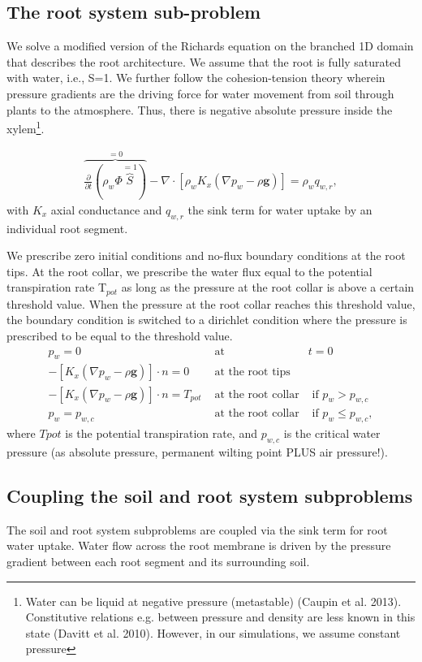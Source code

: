 \subsection*{The root system sub-problem}
We solve a modified version of the Richards equation on the branched 1D domain that describes the root architecture. We assume that the root is fully saturated with water, i.e., S=1. We further follow the cohesion-tension theory wherein pressure gradients are the driving force for water movement from soil through plants to the atmosphere. Thus, there is negative absolute pressure inside the xylem\footnote{Water can be liquid at negative pressure (metastable) (Caupin et al. 2013). Constitutive relations e.g. between pressure and density are less known in this state (Davitt et al. 2010). However, in our simulations, we assume constant pressure}.  

\begin{eqnarray}
\overbrace{\frac{\partial}{\partial t} \left(\rho_w \Phi \overbrace{S}^{=1}  \right)}^{=0} - \nabla  \cdot \left[\rho_w K_x\left(\nabla p_w-\rho \mathbf{g} \right) \right] = \rho_w q_{w,r},
\end{eqnarray}
with $K_x$ axial conductance and $q_{w,r}$ the sink term for water uptake by an individual root segment. 

We prescribe zero initial conditions and no-flux boundary conditions at the root tips. At the root collar, we prescribe the water flux equal to the potential transpiration rate T$_{pot}$ as long as the pressure at the root collar is above a certain threshold value. When the pressure at the root collar reaches this threshold value, the boundary condition is switched to a dirichlet condition where the pressure is prescribed to be equal to the threshold value. 
\begin{eqnarray}
p_w = 0 & \text{ at } & t=0\\
-\left[K_x\left(\nabla p_w-\rho \mathbf{g} \right) \right] \cdot n = 0 & \text{ at  the root tips}\\
-\left[K_x\left(\nabla p_w-\rho \mathbf{g} \right) \right] \cdot n = T_{pot} & \text{ at the root collar} & \text { if } p_w > p_{w,c}\\
p_w = p_{w,c} & \text{ at the root collar} & \text{ if } p_w \le p_{w,c},
\end{eqnarray}
where $T{pot}$ is the potential transpiration rate, and $p_{w,c}$ is the critical water pressure (as absolute pressure, permanent wilting point PLUS air pressure!). 

\subsection*{Coupling the soil and root system subproblems}
The soil and root system subproblems are coupled via the sink term for root water uptake. Water flow across the root membrane is driven by the pressure gradient between each root segment and its surrounding soil. 

